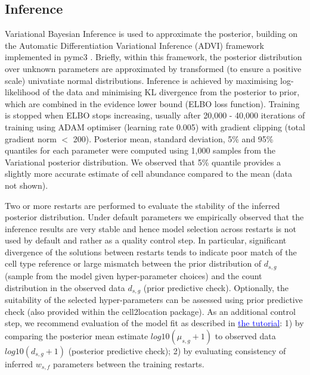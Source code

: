\documentclass[11pt,a4paper]{article}
\newcommand{\blue}{\textcolor{blue}}
\begin{document}
\subsection{Inference} \label{c2l_inference}

Variational Bayesian Inference is used to approximate the posterior, building on the Automatic Differentiation Variational Inference (ADVI) framework implemented in pymc3 \autocite{salvatier_probabilistic_2016}. 
Briefly, within this framework, the posterior distribution over unknown parameters are approximated by transformed (to ensure a positive scale) univatiate normal distributions. Inference is achieved by maximising log-likelihood of the data and minimising KL divergence from the posterior to prior, which are combined in the evidence lower bound (ELBO loss function). 
Training is stopped when ELBO stops increasing, usually after 20,000 - 40,000 iterations of training using ADAM optimiser (learning rate 0.005) with gradient clipping (total gradient norm $<$ 200). 
Posterior mean, standard deviation, 5\% and 95\% quantiles for each parameter were computed using 1,000 samples from the Variational posterior distribution. We observed that 5\% quantile provides a slightly more accurate estimate of cell abundance compared to the mean (data not shown). 

Two or more restarts are performed to evaluate the stability of the inferred posterior distribution. Under default parameters we empirically observed that the inference results are very stable and hence model selection across restarts is not used by default and rather as a quality control step. In particular, significant divergence of the solutions between restarts tends to indicate poor match of the cell type reference or large mismatch between the prior distribution of $d_{s,g}$ (sample from the model given hyper-parameter choices) and the count distribution in the observed data $d_{s,g}$ (prior predictive check). Optionally, the suitability of the selected hyper-parameters can be assessed using prior predictive check (also provided within the cell2location package). As an additional control step, we recommend evaluation of the model fit as described in \href{https://cell2location.readthedocs.io/en/latest/notebooks/cell2location_short_demo.html#Evaluating-training}{\blue{the tutorial}}: 1) by comparing the posterior mean estimate $log10(\mu_{s,g} + 1)$ to observed data $log10(d_{s,g} + 1)$ (posterior predictive check); 2) by evaluating consistency of inferred $w_{s,f}$ parameters between the training restarts.
\end{document}
